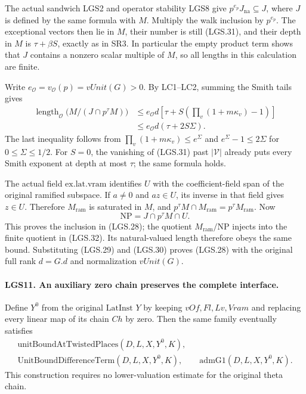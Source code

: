 The actual sandwich LGS2 and operator stability LGS8
give \(p^{e_p}J_{\mathrm{na}}\subseteq J\), where \(J\)
is defined by the same formula with \(M\).
Multiply the walk inclusion by \(p^{e_p}\).
The exceptional vectors then lie in \(M\), their number
is still (LGS.31), and their depth in \(M\) is
\(\tau+\beta S\), exactly as in SR3.
In particular the empty product term shows that \(J\)
contains a nonzero scalar multiple of \(M\), so all
lengths in this calculation are finite.

Write \(e_{\mathcal O}=v_{\mathcal O}(p)=vUnit(G)>0\).
By LC1--LC2, summing the Smith tails gives
\[
 \begin{split}
 \operatorname{length}_{\mathcal O}
       \bigl(M/(J\cap p^\tau M)\bigr)
 &\le e_{\mathcal O}d\left[
       \tau+S\left(\prod_v(1+m\kappa_v)-1\right)\right]\\
 &\le e_{\mathcal O}d(\tau+2S\Sigma).
 \end{split}                                                     \tag{LGS.32}
\]
The last inequality follows from
\(\prod_v(1+m\kappa_v)\le e^\Sigma\) and
\(e^\Sigma-1\le2\Sigma\) for \(0\le\Sigma\le1/2\).
For \(S=0\), the vanishing of (LGS.31) past
\(|\mathcal V|\) already puts every Smith exponent
at depth at most \(\tau\); the same formula holds.

The actual field \(\mathrm{ex.lat.vram}\) identifies
\(U\) with the coefficient-field span of the original
ramified subspace.  If \(a\ne0\) and \(az\in U\), its
inverse in that field gives \(z\in U\).  Therefore
\(M_{\mathrm{ram}}\) is saturated in \(M\), and
\(p^\tau M\cap M_{\mathrm{ram}}=p^\tau M_{\mathrm{ram}}\).
Now
\[
 \mathrm{NP}=J\cap p^\tau M\cap U.
 \]
This proves the inclusion in (LGS.28); the quotient
\(M_{\mathrm{ram}}/\mathrm{NP}\) injects into the
finite quotient in (LGS.32).  Its natural-valued length
therefore obeys the same bound.  Substituting (LGS.29)
and (LGS.30) proves (LGS.28) with the original full
rank \(d=G.d\) and normalization \(vUnit(G)\).

\paragraph{LGS11. An auxiliary zero chain preserves the complete interface.}
\label{claim:LGS11}
Define \(Y^0\) from the original \(\mathrm{LatInst}\)
\(Y\) by keeping \(vOf,Fl,Lv,Vram\) and replacing every
linear map of its chain \(Ch\) by zero.
Then the same family eventually satisfies
\[
 \begin{gathered}
 \mathrm{unitBoundAtTwistedPlaces}(D,L,X,Y^0,K),\\
 \mathrm{UnitBoundDifferenceTerm}(D,L,X,Y^0,K),\qquad
 \mathrm{admG1}(D,L,X,Y^0,K).
 \end{gathered}                                                   \tag{LGS.33}
\]
This construction requires no lower-valuation estimate
for the original theta chain.

